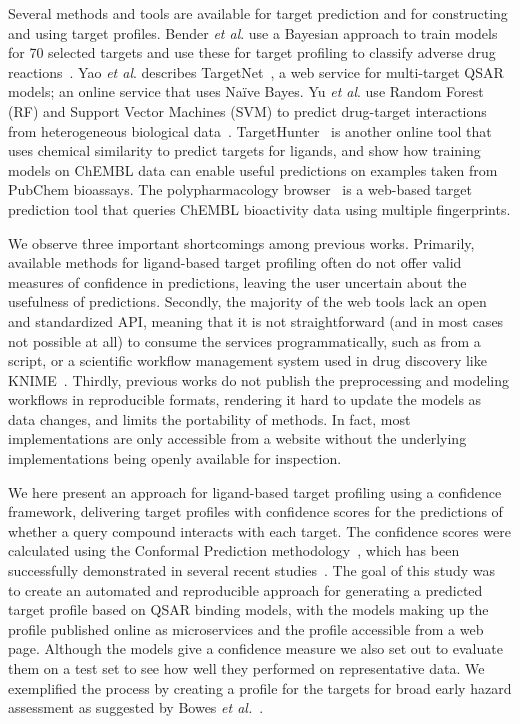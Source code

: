 \documentclass[10pt,article]{memoir}
\begin{document}
Several methods and tools are available for target prediction and for
constructing and using target profiles.
%
Bender \textit{et al}. use a Bayesian approach to train models for 70 selected targets
and use these for target profiling to classify adverse drug
reactions~\cite{Bender:2007ib}.
%
Yao \textit{et al}. describes TargetNet~\cite{Yao:2016ij}, a web service for
multi-target QSAR models; an online service that uses Na\"ive Bayes.
%
Yu \textit{et al}. use Random Forest (RF) and Support Vector Machines (SVM) to predict
drug-target interactions from heterogeneous biological data~\cite{Yu:2012ol}.
%
TargetHunter~\cite{Wang:2013le} is another online tool that uses chemical
similarity to predict targets for ligands, and show how training models on
ChEMBL data can enable useful predictions on examples taken from PubChem
bioassays.
%
The polypharmacology browser~\cite{Awale:2017is} is a web-based target
prediction tool that queries ChEMBL bioactivity data using multiple
fingerprints.


We observe three important shortcomings among previous works. Primarily, available
methods for ligand-based target profiling often do not offer valid measures of
confidence in predictions, leaving the user uncertain about the usefulness of
predictions. Secondly, the majority of the web tools lack an open and
standardized API, meaning that it is not straightforward (and in most cases not
possible at all) to consume the services programmatically, such as from a
script, or a scientific workflow management system used in drug discovery like
KNIME~\cite{Mazanetz:2012gy}. Thirdly, previous works do not publish the preprocessing and modeling workflows in reproducible formats, rendering it hard to update the models as data changes, and limits the portability of methods. In fact, most implementations are only accessible from a website without the underlying implementations being openly available for inspection.

We here present an approach for ligand-based target profiling using a
confidence framework, delivering target profiles with confidence scores for the
predictions of whether a query compound interacts with each target. The
confidence scores were calculated using the Conformal Prediction
methodology~\cite{Vovk2005}, which has been successfully demonstrated in several recent studies~\cite{Cortes-Ciriano:2015ec,Norinder:2014fe,Forreryd:2018kb,Norinder:2016qf}.
%
The goal of this study was to create an automated and reproducible approach for
generating a predicted target profile based on QSAR binding models, with the models
making up the profile published online as microservices and the profile
accessible from a web page. Although the models give a confidence measure we
also set out to evaluate them on a test set to see how well they performed on
representative data. We exemplified the process by creating a profile for the
targets for broad early hazard assessment as suggested by Bowes \textit{et
al.}~\cite{Bowes2012}.
\end{document}
